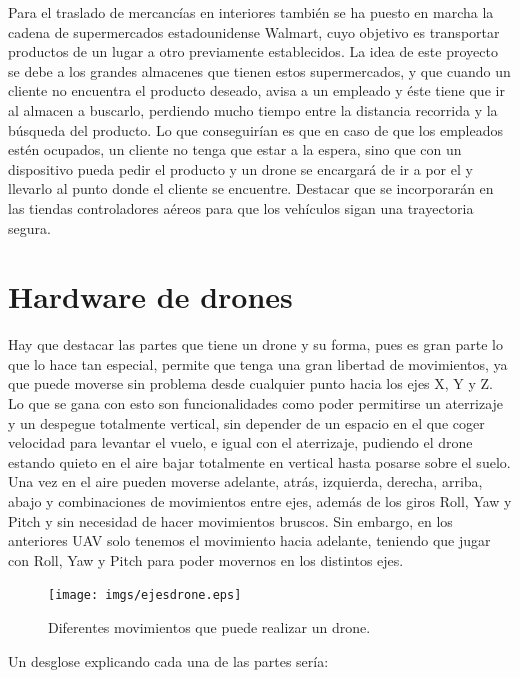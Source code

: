 \hspace{1 cm} Para el traslado de mercanc\'ias en interiores tambi\'en se ha puesto en marcha la cadena de supermercados estadounidense Walmart, cuyo objetivo es transportar productos de un lugar a otro previamente establecidos. La idea de este proyecto se debe a los grandes almacenes que tienen estos supermercados, y que cuando un cliente no encuentra el producto deseado, avisa a un empleado y \'este tiene que ir al almacen a buscarlo, perdiendo mucho tiempo entre la distancia recorrida y la b\'usqueda del producto. Lo que conseguir\'ian es que en caso de que los empleados est\'en ocupados, un cliente no tenga que estar a la espera, sino que con un dispositivo pueda pedir el producto y un drone se encargar\'a de ir a por el y llevarlo al punto donde el cliente se encuentre. Destacar que se incorporar\'an en las tiendas controladores a\'ereos para que los veh\'iculos sigan una trayectoria segura.  


\section{Hardware de drones}
\hspace{1 cm} Hay que destacar las partes que tiene un drone y su forma, pues es gran parte lo que lo hace tan especial, permite que tenga una gran libertad de movimientos, ya que puede moverse sin problema desde cualquier punto hacia los ejes X, Y y Z. Lo que se gana con esto son funcionalidades como poder permitirse un aterrizaje y un despegue totalmente vertical, sin depender de un espacio en el que coger velocidad para levantar el vuelo, e igual con el aterrizaje, pudiendo el drone estando quieto en el aire bajar totalmente en vertical hasta posarse sobre el suelo. Una vez en el aire pueden moverse adelante, atr\'as, izquierda, derecha, arriba, abajo y combinaciones de movimientos entre ejes, adem\'as de los giros Roll, Yaw y Pitch y sin necesidad de hacer movimientos bruscos. Sin embargo, en los anteriores UAV solo tenemos el movimiento hacia adelante, teniendo que jugar con Roll, Yaw y Pitch para poder movernos en los distintos ejes.

\begin{figure}[ht]
	\centering
		\texttt{[image: imgs/ejesdrone.eps]}
		\caption{Diferentes movimientos que puede realizar un drone.}
	\label{fig:ejesdrone}
\end{figure}

\hspace{1 cm} Un desglose explicando cada una de las partes ser\'ia:

